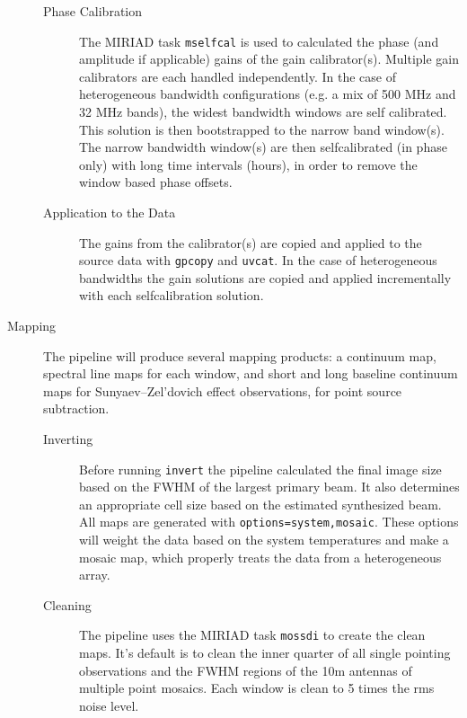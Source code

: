 \begin{description}
\begin{description}
\item[Phase Calibration] The MIRIAD task \verb#mselfcal# is used to calculated the phase (and amplitude if applicable) gains of the gain calibrator(s). Multiple gain calibrators are each handled independently. In the case of heterogeneous bandwidth configurations (e.g. a mix of 500 MHz and 32 MHz bands), the widest bandwidth windows are self calibrated. This solution is then bootstrapped to the narrow band window(s). The narrow bandwidth window(s) are then selfcalibrated (in phase only) with long time intervals (hours), in order to remove the window based phase offsets.
\item[Application to the Data] The gains from the calibrator(s) are copied and applied to the source data with \verb#gpcopy# and \verb#uvcat#. In the case of heterogeneous bandwidths the gain solutions are copied and applied incrementally with each selfcalibration solution. 
\end{description}
\item[Mapping] The pipeline will produce several mapping products: a continuum map, spectral line maps for each window, and short and long baseline continuum maps for Sunyaev–Zel'dovich effect observations, for point source subtraction.
\begin{description}
\item[Inverting] Before running \verb#invert# the pipeline calculated the final image size based on the FWHM of the largest primary beam. It also determines an appropriate cell size based on the estimated synthesized beam. All maps are generated with \verb#options=system,mosaic#. These options will weight the data based on the system temperatures and make a mosaic map, which properly treats the data from a heterogeneous array.
\item[Cleaning] The pipeline uses the MIRIAD task \verb#mossdi# to create the clean maps. It's default is to clean the inner quarter of all single pointing observations and the FWHM regions of the 10m antennas of multiple point mosaics. Each window is clean to 5 times the rms noise level.
\end{description}
\end{description}

